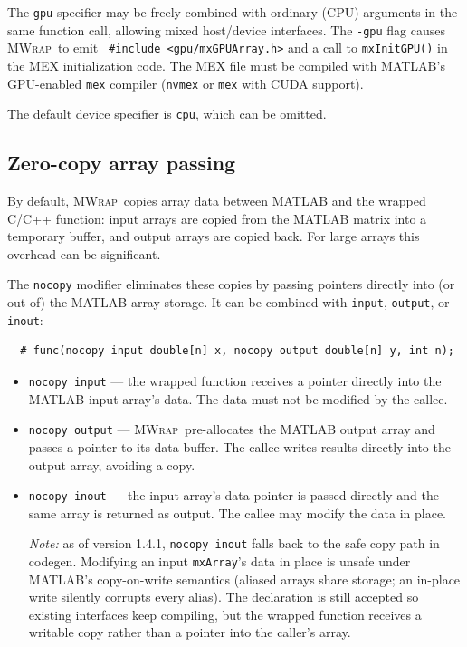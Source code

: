 \documentclass[12pt]{article}
\newcommand{\mwrap}{\textsc{MWrap}}
\begin{document}
The {\tt gpu} specifier may be freely combined with ordinary (CPU)
arguments in the same function call, allowing mixed host/device
interfaces.  The {\tt -gpu} flag causes \mwrap\ to emit {\tt
  \#include <gpu/mxGPUArray.h>} and a call to {\tt mxInitGPU()} in
the MEX initialization code.  The MEX file must be compiled with
MATLAB's GPU-enabled {\tt mex} compiler ({\tt nvmex} or {\tt mex}
with CUDA support).

The default device specifier is {\tt cpu}, which can be omitted.


\subsection{Zero-copy array passing}
\label{nocopy-section}

By default, \mwrap\ copies array data between MATLAB and the
wrapped C/C++ function: input arrays are copied from the MATLAB
matrix into a temporary buffer, and output arrays are copied back.
For large arrays this overhead can be significant.

The {\tt nocopy} modifier eliminates these copies by passing
pointers directly into (or out of) the MATLAB array storage.
It can be combined with {\tt input}, {\tt output}, or {\tt inout}:
\begin{verbatim}
  # func(nocopy input double[n] x, nocopy output double[n] y, int n);
\end{verbatim}

\begin{itemize}
\item {\tt nocopy input} --- the wrapped function receives a pointer
  directly into the MATLAB input array's data.  The data must not be
  modified by the callee.

\item {\tt nocopy output} --- \mwrap\ pre-allocates the MATLAB output
  array and passes a pointer to its data buffer.  The callee writes
  results directly into the output array, avoiding a copy.

\item {\tt nocopy inout} --- the input array's data pointer is passed
  directly and the same array is returned as output.  The callee may
  modify the data in place.

  \emph{Note:} as of version 1.4.1, {\tt nocopy inout} falls back to
  the safe copy path in codegen.  Modifying an input {\tt mxArray}'s
  data in place is unsafe under MATLAB's copy-on-write semantics
  (aliased arrays share storage; an in-place write silently corrupts
  every alias).  The declaration is still accepted so existing
  interfaces keep compiling, but the wrapped function receives a
  writable copy rather than a pointer into the caller's array.
\end{itemize}
\end{document}
